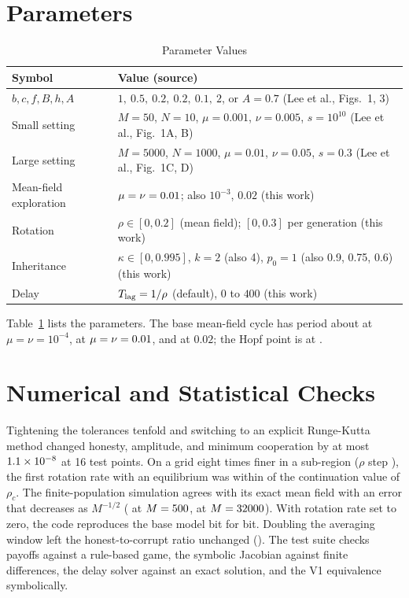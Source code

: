 \documentclass[journal]{IEEEtran}
\newcommand{\rhoc}{\rho_c}
\begin{document}
\section{Parameters}\label{app:params}

\begin{table}[!t]
\centering
\caption{Parameter Values}
\label{tab:params}
\begin{tabular}{>{\raggedright}p{2.0cm}>{\raggedright\arraybackslash}p{5.8cm}}
\toprule
Symbol & Value (source) \\
\midrule
$b,c,f,B,h,A$ & $1,\ 0.5,\ 0.2,\ 0.2,\ 0.1,\ 2$, or $A=0.7$ (Lee et al., Figs.~1, 3) \\
Small setting & $M=50$, $N=10$, $\mu=0.001$, $\nu=0.005$, $s=10^{10}$ (Lee et al., Fig.~1A, B) \\
Large setting & $M=5000$, $N=1000$, $\mu=0.01$, $\nu=0.05$, $s=0.3$ (Lee et al., Fig.~1C, D) \\
Mean-field exploration & $\mu=\nu=0.01$; also $10^{-3}$, $0.02$ (this work) \\
Rotation & $\rho\in[0,0.2]$ (mean field); $[0,0.3]$ per generation (this work) \\
Inheritance & $\kappa\in[0,0.995]$, $k=2$ (also 4), $p_0=1$ (also 0.9, 0.75, 0.6) (this work) \\
Delay & $T_{\rm lag}=1/\rho$ (default), $0$ to $400$ (this work) \\
\bottomrule
\end{tabular}
\end{table}

Table~\ref{tab:params} lists the parameters. The base mean-field cycle has period about \PerSlow{}
at $\mu=\nu=10^{-4}$, \PerZero{} at $\mu=\nu=0.01$, and \PerViolet{} at $0.02$; the Hopf point is
at \HopfMuA.

\section{Numerical and Statistical Checks}\label{app:checks}

Tightening the tolerances tenfold and switching to an explicit Runge-Kutta method changed honesty,
amplitude, and minimum cooperation by at most $1.1\times 10^{-8}$ at 16 test points. On a grid eight
times finer in a sub-region ($\rho$ step \FineGridStep), the first rotation rate with an
equilibrium was within \FineGridMaxOff{} of the continuation value of $\rhoc$. The
finite-population simulation agrees with its exact mean field with an error that decreases as
$M^{-1/2}$ (\ValRmsA{} at $M=500$, \ValRmsD{} at $M=32000$). With rotation rate set to zero,
the code reproduces the base model bit for bit. Doubling the averaging window left the
honest-to-corrupt ratio unchanged (\BthreeDouble). The test suite checks payoffs against a
rule-based game, the symbolic Jacobian against finite differences, the delay solver against an
exact solution, and the V1 equivalence symbolically.
\end{document}
